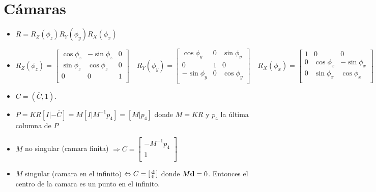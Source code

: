 \documentclass[12pt,a4paper]{article}
\begin{document}
\section{C\'amaras}

\begin{itemize}

	\item $R = R_{Z}(\phi_{z})R_{Y}(\phi_{y})R_{X}(\phi_{x})$

\item $
	R_{Z}(\phi_{z}) =
	\left[ {\begin{smallmatrix}
	 \cos{\phi_{z}} & -\sin{\phi_{z}} & 0 \\
	 \sin{\phi_{z}} & \cos{\phi_{z}} & 0 \\
	 0 & 0 & 1\\
	\end{smallmatrix} } \right] \quad R_{Y}(\phi_{y}) =
	\left[ {\begin{smallmatrix}
		\cos{\phi_{y}} & 0 & \sin{\phi_{y}}\\
		 0 & 1 & 0\\
	    -\sin{\phi_{y}} & 0 & \cos{\phi_{y}}\\
	\end{smallmatrix} } \right] \quad R_{X}(\phi_{x}) =
	\left[ {\begin{smallmatrix}
		1 & 0 & 0\\ 
	    0 & \cos{\phi_{x}} & -\sin{\phi_{x}}\\
	    0 & \sin{\phi_{x}} & \cos{\phi_{x}}\\
	\end{smallmatrix} } \right]
	$

	\item $C = (\overline{C}, 1)$.

	\item $P = KR [I |- \overline{C}] = M[I|M^{-1}p_{4}] = [M|p_{4}]$ donde $M= KR$ y $p_{4}$ la \'ultima columna de $P$

	\item $M$ no singular (camara finita) $\Rightarrow C = \left[ {\begin{smallmatrix}
		-M^{-1}p_{4}\\ 
		 1\\
	\end{smallmatrix} } \right]$ 

	\item $M$ singular (camara en el infinito) $\Leftrightarrow C = \left[ {\begin{smallmatrix}
		{\bf d}\\ 
		0\\
	\end{smallmatrix} } \right]$ donde $M {\bf d} = 0$. Entonces el centro de la camara es un punto en el infinito.


\end{itemize}
\end{document}
